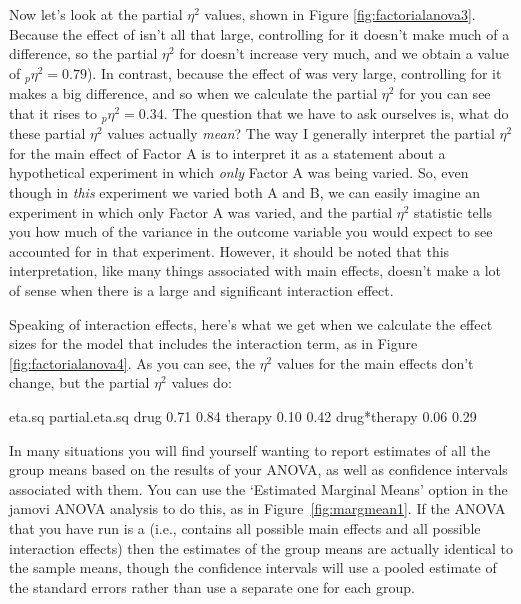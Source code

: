 Now let's look at the partial $\eta^2$ values, shown in Figure \ref{fig:factorialanova3}. Because the effect of  isn't all that large, controlling for it doesn't make much of a difference, so the partial $\eta^2$ for  doesn't increase very much, and we obtain a value of $_p\eta^2 = 0.79$). In contrast, because the effect of  was very large, controlling for it makes a big difference, and so when we calculate the partial $\eta^2$ for  you can see that it rises to $_p\eta^2 = 0.34$. The question that we have to ask ourselves is, what do these partial $\eta^2$ values actually {\it mean}? The way I generally interpret the partial $\eta^2$ for the main effect of Factor A is to interpret it as a statement about a hypothetical experiment in which {\it only} Factor A was being varied. So, even though in {\it this} experiment we varied both A and B, we can easily imagine an experiment in which only Factor A was varied, and the partial $\eta^2$ statistic tells you how much of the variance in the outcome variable you would expect to see accounted for in that experiment. However, it should be noted that this interpretation, like many things associated with main effects, doesn't make a lot of sense when there is a large and significant interaction effect. 

Speaking of interaction effects, here's what we get when we calculate the effect sizes for the model that includes the interaction term, as in Figure \ref{fig:factorialanova4}. As you can see, the $\eta^2$ values for the main effects don't change, but the partial $\eta^2$ values do:

\begin{rblock1}
               eta.sq partial.eta.sq
drug            0.71        0.84
therapy         0.10        0.42
drug*therapy    0.06        0.29
\end{rblock1}

\bigskip
{}

In many situations you will find yourself wanting to report estimates of all the group means based on the results of your ANOVA, as well as confidence intervals associated with them. You can use the `Estimated Marginal Means' option in the jamovi ANOVA analysis to do this, as in Figure~\ref{fig:margmean1}. If the ANOVA that you have run is a  (i.e., contains all possible main effects and all possible interaction effects) then the estimates of the group means are actually identical to the sample means, though the confidence intervals will use a pooled estimate of the standard errors rather than use a separate one for each group. 

